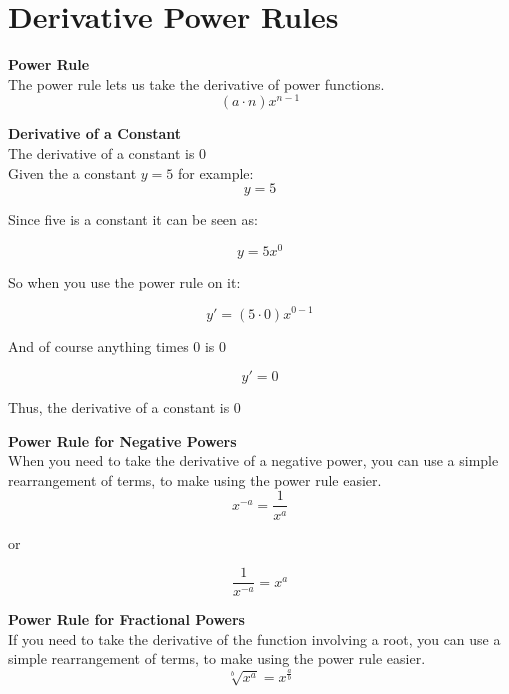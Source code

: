\section{Derivative Power Rules}

\begin{framed}
\noindent \textbf{Power Rule}\\
The power rule lets us take the derivative of power functions.
  \begin{equation*}
    (a \cdot n)x^{n - 1}
  \end{equation*}
\end{framed}

\begin{framed}
\noindent \textbf{Derivative of a Constant}\\
The derivative of a constant is 0\\
Given the a constant $y = 5$ for example:
  \begin{equation*}
    y = 5
  \end{equation*}
  \centerline{Since five is a constant it can be seen as:}
  \begin{equation*}
    y = 5x^0
  \end{equation*}
  \centerline{So when you use the power rule on it:}
  \begin{equation*}
    y' = (5 \cdot 0)x^{0-1}
  \end{equation*}
  \centerline{And of course anything times 0 is 0}
  \begin{equation*}
    y' = 0
  \end{equation*}
  \centerline{Thus, the derivative of a constant is 0}
\end{framed}

\begin{framed}
\noindent \textbf{Power Rule for Negative Powers}\\
When you need to take the derivative of a negative power, you can use a simple
rearrangement of terms, to make using the power rule easier.
  \begin{equation*}
    x^{-a}= \frac{1}{x^a}
  \end{equation*}
  \centerline{or}
  \begin{equation*}
    \frac{1}{x^{-a}} = x^a
  \end{equation*}
\end{framed}

\begin{framed}
\noindent \textbf{Power Rule for Fractional Powers}\\
If you need to take the derivative of the function involving a root, you can 
use a simple rearrangement of terms, to make using the power rule easier.
  \begin{equation*}
    \sqrt[b]{x^a} = x^{\frac{a}{b}}
  \end{equation*}
\end{framed}


